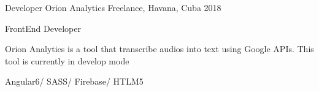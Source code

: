 \begin{cventries}
\cventry
{Developer} %
{Orion Analytics} %
{Freelance, Havana, Cuba} %
{2018} %
{ %
\begin{cvitems}
\item {FrontEnd Developer}
\item {Orion Analytics is a tool that transcribe audios into text using Google APIs. This tool is currently in develop mode}
\item {Angular6/ SASS/ Firebase/ HTLM5}
\end{cvitems}
}


\end{cventries}

